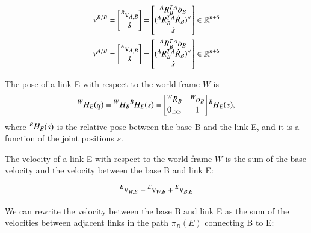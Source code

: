 \begin{align}
    \nu^{B/B} = 
    \begin{bmatrix}
        {}^{B}{\text{v}}_{A,B}\\
        \dot{s}
    \end{bmatrix} = 
    \begin{bmatrix}
        {}^{A}{R}_{B}^T {}^{A}{\dot{o}}_{B}\\
        ({}^{A}{R}_{B}^T {}^{A}{\dot{R}}_{B})^\vee\\
        \dot{s}
    \end{bmatrix} \in \mathbb{R}^{n+6}
    \\
    \nu^{A/B} = 
    \begin{bmatrix}
        {}^{A}{\text{v}}_{A,B}\\
        \dot{s}
    \end{bmatrix} = 
    \begin{bmatrix}
        {}^{A}{R}_{B}^T {}^{A}{\dot{o}}_{B}\\
        ({}^{A}{R}_{B}^T {}^{A}{\dot{R}}_{B})^\vee\\
        \dot{s}
    \end{bmatrix} \in \mathbb{R}^{n+6}
\end{align}

The pose of a link E with respect to the world frame $W$ is
\begin{equation}
    {}^{W}{H}_{E}(q) = {}^{W}{H}_{B}{}^{B}{H}_{E}(s) =
    \begin{bmatrix}
        {}^{W}{R}_{B} & {}^{W}{o}_{B}\\
        0_{1\times3} & 1
    \end{bmatrix}{}^{B}{H}_{E}(s),
\end{equation}
where ${}^{B}{H}_{E}(s)$ is the relative pose between the base B and the link E, and it is a function of the joint positions $s$.

The velocity of a link E with respect to the world frame $W$ is the sum of the base velocity and the velocity between the base B and link E:

\begin{equation}\label{velocity_link_world_frame}
    {}^{E}{\text{v}}_{W,E} + {}^{E}{\text{v}}_{W,B} + {}^{E}{\text{v}}_{B,E}
\end{equation}

We can rewrite the velocity between the base B and link E as the sum of the velocities between adjacent links in the path $\pi_B(E)$ connecting B to E:

